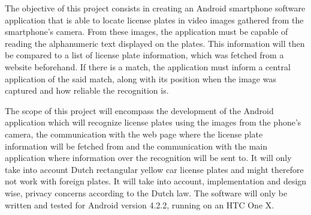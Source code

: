 
The objective of this project consists in creating an Android smartphone software application that is able to locate license plates in video images gathered from the smartphone's camera. From these images, the application must be capable of reading the alphanumeric text displayed on the plates. This information will then be compared to a list of license plate information, which was fetched from a website beforehand. If there is a match, the application must inform a central application of the said match, along with its position when the image was captured and how reliable the recognition is.


The scope of this project will encompass the development of the Android application which will recognize license plates using the images from the phone's camera, the communication with the web page where the license plate information will be fetched from and the communication with the main application where information over the recognition will be sent to. It will only take into account Dutch rectangular yellow car license plates and might therefore not work with foreign plates. It will take into account, implementation and design wise, privacy concerns according to the Dutch law. The software will only be written and tested for Android version 4.2.2, running on an HTC One X.
